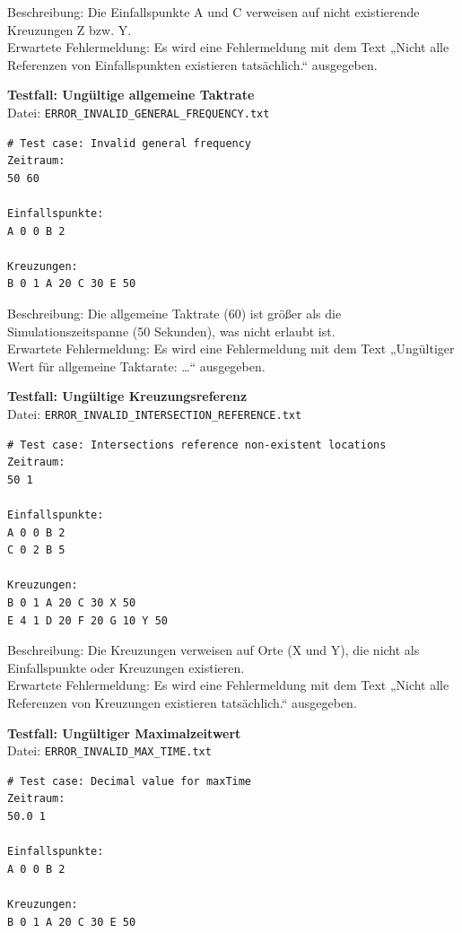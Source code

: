 Beschreibung: Die Einfallspunkte A und C verweisen auf nicht existierende Kreuzungen Z bzw. Y. \\
Erwartete Fehlermeldung: Es wird eine Fehlermeldung mit dem Text „Nicht alle Referenzen von Einfallspunkten existieren tatsächlich.“ ausgegeben.

\textbf{Testfall: Ungültige allgemeine Taktrate} \\
Datei: \texttt{ERROR\_INVALID\_GENERAL\_FREQUENCY.txt}

\begin{lstlisting}
# Test case: Invalid general frequency
Zeitraum:
50 60

Einfallspunkte:
A 0 0 B 2

Kreuzungen:
B 0 1 A 20 C 30 E 50
\end{lstlisting}

Beschreibung: Die allgemeine Taktrate (60) ist größer als die Simulationszeitspanne (50 Sekunden), was nicht erlaubt ist. \\
Erwartete Fehlermeldung: Es wird eine Fehlermeldung mit dem Text „Ungültiger Wert für allgemeine Taktarate: …“ ausgegeben.

\clearpage

\textbf{Testfall: Ungültige Kreuzungsreferenz} \\
Datei: \texttt{ERROR\_INVALID\_INTERSECTION\_REFERENCE.txt}

\begin{lstlisting}
# Test case: Intersections reference non-existent locations
Zeitraum:
50 1

Einfallspunkte:
A 0 0 B 2
C 0 2 B 5

Kreuzungen:
B 0 1 A 20 C 30 X 50
E 4 1 D 20 F 20 G 10 Y 50
\end{lstlisting}

Beschreibung: Die Kreuzungen verweisen auf Orte (X und Y), die nicht als Einfallspunkte oder Kreuzungen existieren. \\
Erwartete Fehlermeldung: Es wird eine Fehlermeldung mit dem Text „Nicht alle Referenzen von Kreuzungen existieren tatsächlich.“ ausgegeben.

\textbf{Testfall: Ungültiger Maximalzeitwert} \\
Datei: \texttt{ERROR\_INVALID\_MAX\_TIME.txt}

\begin{lstlisting}
# Test case: Decimal value for maxTime
Zeitraum:
50.0 1

Einfallspunkte:
A 0 0 B 2

Kreuzungen:
B 0 1 A 20 C 30 E 50
\end{lstlisting}

